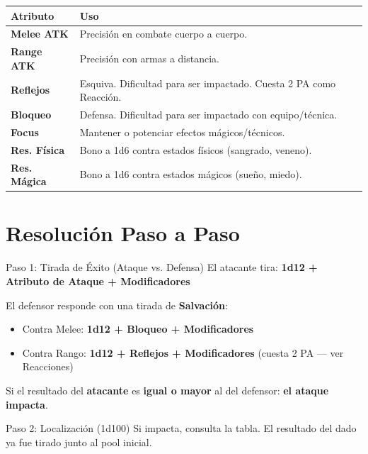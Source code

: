 \begin{center}
\begin{tabularx}{\linewidth}{|l|X|}
\hline
\rowcolor{HammerRed!15} \textbf{Atributo} & \textbf{Uso} \\ \hline
\textbf{Melee ATK} & Precisión en combate cuerpo a cuerpo. \\ \hline
\textbf{Range ATK} & Precisión con armas a distancia. \\ \hline
\textbf{Reflejos} & Esquiva. Dificultad para ser impactado. Cuesta 2 PA como Reacción. \\ \hline
\textbf{Bloqueo} & Defensa. Dificultad para ser impactado con equipo/técnica. \\ \hline
\textbf{Focus} & Mantener o potenciar efectos mágicos/técnicos. \\ \hline
\textbf{Res. Física} & Bono a 1d6 contra estados físicos (sangrado, veneno). \\ \hline
\textbf{Res. Mágica} & Bono a 1d6 contra estados mágicos (sueño, miedo). \\ \hline
\end{tabularx}
\end{center}

\section{Resolución Paso a Paso}

\begin{reglaespecial}{Paso 1: Tirada de Éxito (Ataque vs. Defensa)}
El atacante tira: \textbf{1d12 + Atributo de Ataque + Modificadores}

El defensor responde con una tirada de \textbf{Salvación}:
\begin{itemize}
    \item Contra Melee: \textbf{1d12 + Bloqueo + Modificadores}
    \item Contra Rango: \textbf{1d12 + Reflejos + Modificadores} (cuesta 2 PA — ver Reacciones)
\end{itemize}

Si el resultado del \textbf{atacante} es \textbf{igual o mayor} al del defensor: \textbf{el ataque impacta}.
\end{reglaespecial}

\begin{reglaespecial}{Paso 2: Localización (1d100)}
Si impacta, consulta la tabla. El resultado del dado ya fue tirado junto al pool inicial.
\end{reglaespecial}

